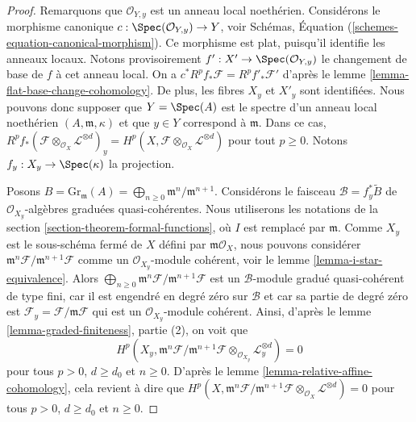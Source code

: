 \begin{proof}
Remarquons que $\mathcal{O}_{Y, y}$ est un anneau local noethérien.
Considérons le morphisme canonique
$c : \Spec(\mathcal{O}_{Y, y}) \to Y$, voir
Schémas, Équation (\ref{schemes-equation-canonical-morphism}).
Ce morphisme est plat, puisqu'il identifie les anneaux locaux.
Notons provisoirement $f' : X' \to \Spec(\mathcal{O}_{Y, y})$
le changement de base de $f$ à cet anneau local. On a
$c^*R^pf_*\mathcal{F} = R^pf'_*\mathcal{F}'$ d'après le
lemme \ref{lemma-flat-base-change-cohomology}.
De plus, les fibres $X_y$ et $X'_y$ sont identifiées.
Nous pouvons donc supposer que $Y = \Spec(A)$ est le spectre d'un
anneau local noethérien $(A, \mathfrak m, \kappa)$ et que $y \in Y$
correspond à $\mathfrak m$. Dans ce cas,
$R^pf_*(\mathcal{F} \otimes_{\mathcal{O}_X} \mathcal{L}^{\otimes d})_y =
H^p(X, \mathcal{F} \otimes_{\mathcal{O}_X} \mathcal{L}^{\otimes d})$
pour tout $p \geq 0$. Notons $f_y : X_y \to \Spec(\kappa)$ la projection.

\medskip\noindent
Posons $B = \text{Gr}_\mathfrak m(A) =
\bigoplus_{n \geq 0} \mathfrak m^n/\mathfrak m^{n + 1}$.
Considérons le faisceau $\mathcal{B} = f_y^*\widetilde{B}$
de $\mathcal{O}_{X_y}$-algèbres
graduées quasi-cohérentes. Nous utiliserons les notations de la section \ref{section-theorem-formal-functions},
où $I$ est remplacé par $\mathfrak m$.
Comme $X_y$ est le sous-schéma fermé de $X$ défini par
$\mathfrak m\mathcal{O}_X$, nous pouvons considérer
$\mathfrak m^n\mathcal{F}/\mathfrak m^{n + 1}\mathcal{F}$
comme un $\mathcal{O}_{X_y}$-module cohérent, voir
le lemme \ref{lemma-i-star-equivalence}. Alors
$\bigoplus_{n \geq 0} \mathfrak m^n\mathcal{F}/\mathfrak m^{n + 1}\mathcal{F}$
est un $\mathcal{B}$-module gradué quasi-cohérent de type
fini, car il est engendré en degré zéro sur $\mathcal{B}$
et car sa partie de degré zéro est
$\mathcal{F}_y = \mathcal{F}/\mathfrak m \mathcal{F}$
qui est un $\mathcal{O}_{X_y}$-module cohérent.
Ainsi, d'après le lemme \ref{lemma-graded-finiteness}, partie
(2), on voit que
$$
H^p(X_y, \mathfrak m^n \mathcal{F}/ \mathfrak m^{n + 1}\mathcal{F}
\otimes_{\mathcal{O}_{X_y}} \mathcal{L}_y^{\otimes d}) = 0
$$
pour tous $p > 0$, $d \geq d_0$ et $n \geq 0$. D'après le
lemme \ref{lemma-relative-affine-cohomology},
cela revient à dire que
$
H^p(X, \mathfrak m^n \mathcal{F}/ \mathfrak m^{n + 1}\mathcal{F}
\otimes_{\mathcal{O}_X} \mathcal{L}^{\otimes d}) = 0
$
pour tous $p > 0$, $d \geq d_0$ et $n \geq 0$.


\end{proof}
